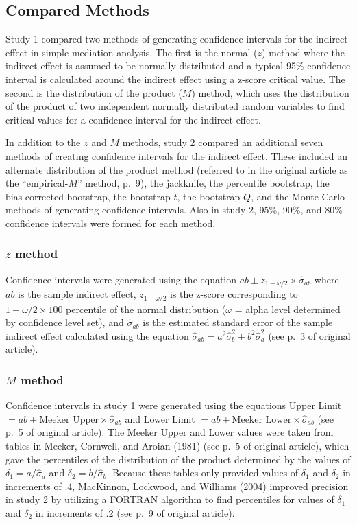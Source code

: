 \documentclass[10,a4paperpaper,]{article}
\begin{document}
\subsection{Compared Methods}

Study 1 compared two methods of generating confidence intervals for the
indirect effect in simple mediation analysis. The first is the normal
(\(z\)) method where the indirect effect is assumed to be normally
distributed and a typical 95\% confidence interval is calculated around
the indirect effect using a z-score critical value. The second is the
distribution of the product (\(M\)) method, which uses the distribution
of the product of two independent normally distributed random variables
to find critical values for a confidence interval for the indirect
effect.

In addition to the \(z\) and \(M\) methods, study 2 compared an
additional seven methods of creating confidence intervals for the
indirect effect. These included an alternate distribution of the product
method (referred to in the original article as the ``empirical-\(M\)''
method, p.~9), the jackknife, the percentile bootstrap, the
bias-corrected bootstrap, the bootstrap-\(t\), the bootstrap-\(Q\), and
the Monte Carlo methods of generating confidence intervals. Also in
study 2, 95\%, 90\%, and 80\% confidence intervals were formed for each
method.

\subsubsection{$z$ method}

Confidence intervals were generated using the equation
\(ab \pm z_{1- \omega/2} \times \hat{\sigma}_{ab}\) where \(ab\) is the
sample indirect effect, \(z_{1- \omega/2}\) is the z-score corresponding
to \(1- \omega/2 \times 100\) percentile of the normal distribution
(\(\omega\) = alpha level determined by confidence level set), and
\(\hat{\sigma}_{ab}\) is the estimated standard error of the sample
indirect effect calculated using the equation
\(\hat{\sigma}_{ab} = a^2 \hat{\sigma}^2_b + b^2 \hat{\sigma}^2_a\) (see
p.~3 of original article).

\subsubsection{$M$ method}

Confidence intervals in study 1 were generated using the equations Upper
Limit \(=ab+\text{Meeker Upper} \times \hat{\sigma}_{ab}\) and Lower
Limit \(=ab+\text{Meeker Lower} \times \hat{\sigma}_{ab}\) (see p.~5 of
original article). The Meeker Upper and Lower values were taken from
tables in Meeker, Cornwell, and Aroian (1981) (see p.~5 of original
article), which gave the percentiles of the distribution of the product
determined by the values of \(\delta_1 = a/\hat{\sigma}_a\) and
\(\delta_2 = b/\hat{\sigma}_b\). Because these tables only provided
values of \(\delta_1\) and \(\delta_2\) in increments of .4, MacKinnon,
Lockwood, and Williams (2004) improved precision in study 2 by utilizing
a FORTRAN algorithm to find percentiles for values of \(\delta_1\) and
\(\delta_2\) in increments of .2 (see p.~9 of original article).
\end{document}
